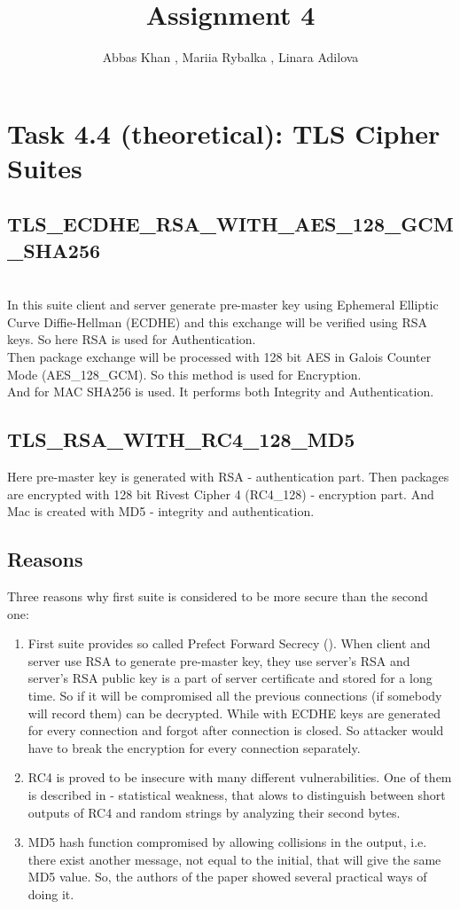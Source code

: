 \documentclass{article}
\title{Assignment 4}
\author{Abbas Khan , Mariia Rybalka , Linara Adilova}
\begin{document}
\maketitle 
    
\section*{Task 4.4 (theoretical): TLS Cipher Suites}
\subsection*{TLS\_ECDHE\_RSA\_WITH\_AES\_128\_GCM\_SHA256}
\cite{tls-ref}
\\
In this suite client and server generate pre-master key using Ephemeral Elliptic Curve Diffie-Hellman (ECDHE) and this exchange will be verified using RSA keys. So here RSA is used for Authentication. 
\\
Then package exchange will be processed with 128 bit AES in Galois Counter Mode (AES\_128\_GCM). So this method is used for Encryption.
\\
And for MAC SHA256 is used. It performs both Integrity and Authentication.

\subsection*{TLS\_RSA\_WITH\_RC4\_128\_MD5}
Here pre-master key is generated with RSA - authentication part. Then packages are encrypted with 128 bit Rivest Cipher 4 (RC4\_128) - encryption part. And Mac is created with MD5 - integrity and authentication.

\subsection*{Reasons}
Three reasons why first suite is considered to be more secure than the second one:
\begin{enumerate}
\item First suite provides so called Prefect Forward Secrecy (\cite{pfc}). When client and server use RSA to generate pre-master key, they use server's RSA and server's RSA public key is a part of server certificate and stored for a long time. So if it will be compromised all the previous connections (if somebody will record them) can be decrypted. While with ECDHE keys are generated for every connection and forgot after connection is closed. So attacker would have to break the encryption for every connection separately.
\item RC4 is proved to be insecure with many different vulnerabilities. One of them is described in \cite{rc4-vuln} - statistical weakness, that alows to distinguish between short outputs of RC4 and random strings by analyzing their second bytes. 
\item MD5 hash function compromised by allowing collisions in the output, i.e. there exist another message, not equal to the initial, that will give the same MD5 value. So, the authors of the paper \cite{md5-coll} showed several practical ways of doing it.
\end{enumerate}
\end{document}
